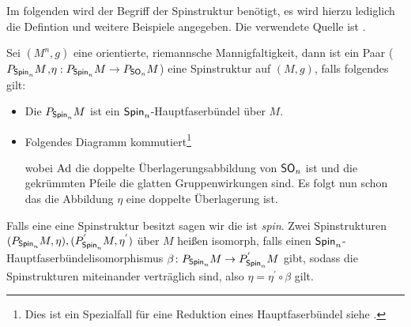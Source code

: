 Im folgenden wird der Begriff der Spinstruktur benötigt, es wird
hierzu lediglich die Defintion und weitere Beispiele angegeben.  Die
verwendete Quelle ist \cite{BHMMM15}.   
\begin{Def}[Spinstruktur]\label{DefSpin}
  Sei $(M^n,g)$ eine orientierte, riemannsche Mannigfaltigkeit, dann ist ein Paar
  ($P_{\operatorname{\mathsf{Spin}}_n}M$,$\eta : P_{\operatorname{\mathsf{Spin}}_n}M \rightarrow
  P_{\operatorname{\mathsf{SO}}_n}M$) eine Spinstruktur auf $(M,g)$, falls folgendes gilt:
	 \begin{itemize}
         \item Die \mfg $P_{\operatorname{\mathsf{Spin}}_n}M$ ist ein
           $\operatorname{\mathsf{Spin}}_n$-Hauptfaserbündel über $ M $.
         \item Folgendes Diagramm kommutiert\footnote{Dies ist ein Spezialfall für eine Reduktion eines Hauptfaserbündel siehe \cite{baum09}.}\\

           \begin{center}
           \end{center}

                         wobei $\operatorname{Ad}$ die doppelte
                         Überlagerungsabbildung von $\operatorname{\mathsf{SO}}_n$ ist und
                        die gekrümmten Pfeile die glatten Gruppenwirkungen sind.
                         Es folgt nun schon das die Abbildung $\eta$   eine doppelte Überlagerung ist.
	 \end{itemize}
	 Falls eine \RMF eine Spinstruktur besitzt sagen wir die \mfg
         ist \textit{spin}.
     Zwei Spinstrukturen $ (P_{\operatorname{\mathsf{Spin}}_n}M,\eta),(P_{\operatorname{\mathsf{Spin}}_n}^{'}M,\eta^{'}) $ über $ M $ heißen isomorph, falls einen $ \operatorname{\mathsf{Spin}}_n $-Hauptfaserbündelisomorphismus $ \beta \colon P_{\operatorname{\mathsf{Spin}}_n}M \rightarrow P_{\operatorname{\mathsf{Spin}}_n}^{'}M $ gibt, sodass die
     Spinstrukturen miteinander verträglich sind, also $ \eta=\eta^{'} \circ \beta $ gilt.
\end{Def}


